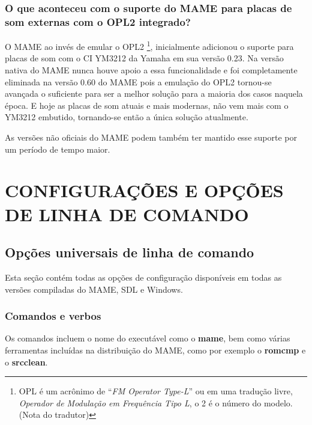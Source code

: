 \documentclass[letterpaper,10pt,brazil]{sphinxmanual}
\begin{document}
\subsection{O que aconteceu com o suporte do MAME para placas de som externas com o OPL2 integrado?}
\label{usingmame/commonissues:o-que-aconteceu-com-o-suporte-do-mame-para-placas-de-som-externas-com-o-opl2-integrado}\label{usingmame/commonissues:externalopl}
O MAME ao invés de emular o OPL2 \footnote[2]{\sphinxAtStartFootnote%
OPL é um acrônimo de ``\emph{FM Operator Type-L}'' ou em uma tradução
livre, \emph{Operador de Modulação em Frequência Tipo L}, o 2 é o
número do modelo. (Nota do tradutor)
}, inicialmente adicionou o suporte
para placas de som com o CI YM3212 da Yamaha em sua versão 0.23.
Na versão nativa do MAME nunca houve apoio a essa funcionalidade e foi
completamente eliminada na versão 0.60 do MAME pois a emulação do OPL2
tornou-se avançada o suficiente para ser a melhor solução para a
maioria dos casos naquela época. E hoje as placas de som atuais e mais
modernas, não vem mais com o YM3212 embutido, tornando-se então a única
solução atualmente.

As versões não oficiais do MAME podem também ter mantido esse suporte
por um período de tempo maior.


\chapter{CONFIGURAÇÕES E OPÇÕES DE LINHA DE COMANDO}
\label{commandline/index:configuracoes-e-opcoes-de-linha-de-comando}\label{commandline/index::doc}

\section{Opções universais de linha de comando}
\label{commandline/commandline-all:opcoes-universais-de-linha-de-comando}\label{commandline/commandline-all::doc}
Esta seção contém todas as opções de configuração disponíveis em todas
as versões compiladas do MAME, SDL e Windows.


\subsection{Comandos e verbos}
\label{commandline/commandline-all:comandos-e-verbos}
Os comandos incluem o nome do executável como o \textbf{mame}, bem como
várias ferramentas incluídas na distribuição do MAME, como por exemplo
o \textbf{romcmp} e o \textbf{srcclean}.
\end{document}
